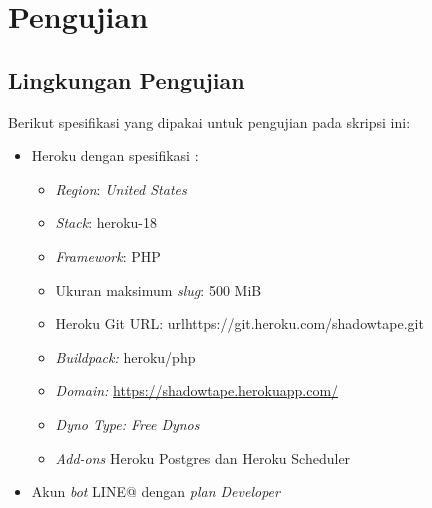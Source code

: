 \section{Pengujian}
\subsection{Lingkungan Pengujian}
Berikut spesifikasi yang dipakai untuk pengujian pada skripsi ini:
\begin{itemize}
\item Heroku dengan spesifikasi :

\begin{itemize}
\item \textit{Region}: \textit{United States}
\item \textit{Stack}: heroku-18
\item \textit{Framework}: PHP
\item Ukuran maksimum \textit{slug}: 500 MiB
\item Heroku Git URL: url{https://git.heroku.com/shadowtape.git}
\item \textit{Buildpack:} heroku/php
\item \textit{Domain:} \url{https://shadowtape.herokuapp.com/}
\item \textit{Dyno Type: Free Dynos}
\item \textit{Add-ons} Heroku Postgres dan Heroku Scheduler
\end{itemize}

\item Akun \textit{bot} LINE@ dengan \textit{plan Developer}
\end{itemize}


